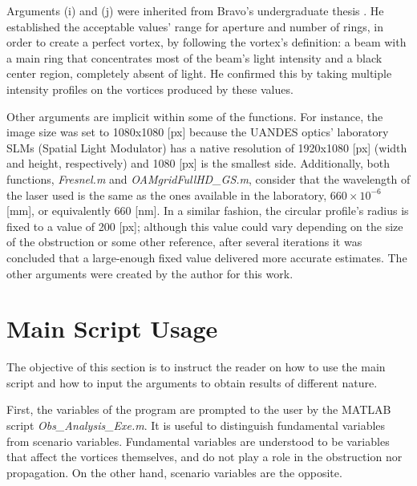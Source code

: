 
Arguments (i) and (j) were inherited from Bravo's undergraduate thesis \cite{Thesis_Herbert:2020}. He established the acceptable values' range for aperture and number of rings, in order to create a perfect vortex, by following the vortex's definition: a beam with a main ring that concentrates most of the beam's light intensity and a black center region, completely absent of light. He confirmed this by taking multiple intensity profiles on the vortices produced by these values.

Other arguments are implicit within some of the functions. For instance, the image size was set to 1080x1080 [px] because the UANDES optics' laboratory SLMs (Spatial Light Modulator) has a native resolution of 1920x1080 [px] (width and height, respectively) and 1080 [px] is the smallest side. Additionally, both functions, \textit{Fresnel.m} and \textit{OAMgridFullHD\_GS.m}, consider that the wavelength of the laser used is the same as the ones available in the laboratory, $660 \times 10^{-6}$ [mm], or equivalently 660 [nm]. In a similar fashion, the circular profile's radius is fixed to a value of 200 [px]; although this value could vary depending on the size of the obstruction or some other reference, after several iterations it was concluded that a large-enough fixed value delivered more accurate estimates. The other arguments were created by the author for this work.

\section{Main Script Usage}

The objective of this section is to instruct the reader on how to use the main script and how to input the arguments to obtain results of different nature.

First, the variables of the program are prompted to the user by the MATLAB script \textit{Obs\_Analysis\_Exe.m}. It is useful to distinguish fundamental variables from scenario variables. Fundamental variables are understood to be variables that affect the vortices themselves, and do not play a role in the obstruction nor propagation. On the other hand, scenario variables are the opposite.

